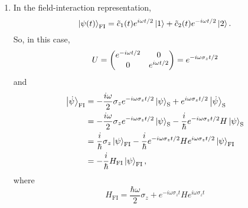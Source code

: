 \documentclass[12pt]{article}
\begin{document}
\begin{enumerate}[label=(\alph*)]
    \item In the field-interaction representation, 
    \[ \ket{\psi(t)}_\text{FI} = \tilde{c}_1(t)e^{i\omega t/2}\ket{1} + \tilde{c}_2(t)e^{-i\omega t/2}\ket{2}. \]
    So, in this case,
    \[ U = \mqty(e^{-i\omega t/2}&0\\0&e^{i\omega t/2}) = e^{-i\omega\sigma_zt/2}\]
    and
    \begin{align*}
        \ket{\dot{\psi}}_\text{FI} &= -\frac{i\omega}{2}\sigma_z e^{-i\omega\sigma_zt/2}\ket{\psi}_\text{S} + e^{i\omega\sigma_zt/2}\ket{\dot{\psi}}_\text{S}\\
        &= -\frac{i\omega}{2}\sigma_z e^{-i\omega\sigma_zt/2}\ket{\psi}_\text{S} - \frac{i}{\hbar}e^{-i\omega\sigma_zt/2}H\ket{\psi}_\text{S} \\
        &= \frac{i}{\hbar}\sigma_z\ket{\psi}_\text{FI} - \frac{i}{\hbar}e^{-i\omega\sigma_zt/2}He^{i\omega\sigma_zt/2}\ket{\psi}_\text{FI} \\
        &= -\frac{i}{\hbar}H_\text{FI}\ket{\psi}_\text{FI},
    \end{align*}
    where 
    \[ H_\text{FI} = \frac{\hbar\omega}{2}\sigma_z  + e^{-i\omega\sigma_zt}He^{i\omega\sigma_zt} \]
\end{enumerate}
\end{document}
